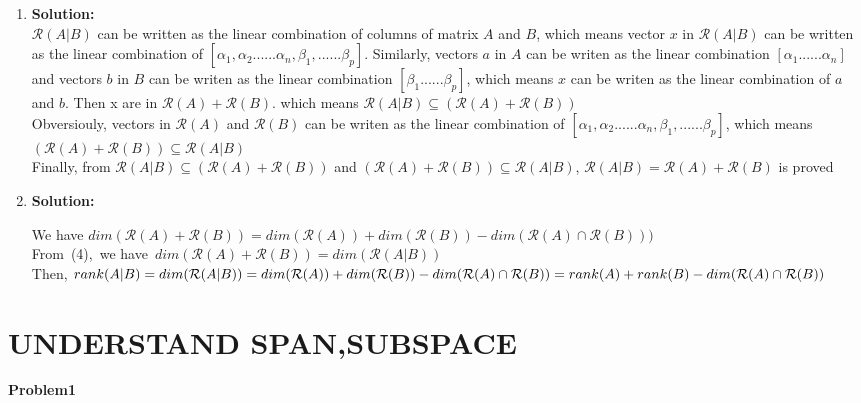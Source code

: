 \documentclass[english,onecolumn,UTF8]{IEEEtran}
\begin{document}
\begin{enumerate}
\begin{enumerate}
	\end{enumerate}

	\item \textbf{Solution:}\\
	$\mathcal{R}(A|B)$ can be written as the linear combination of columns of matrix $A$ and $B$, which means vector $x$ in $\mathcal{R}(A|B)$  can be written as the linear combination of $[\alpha_{1},\alpha_{2}......\alpha_{n},\beta_{1},......\beta_{p}]$. Similarly,  vectors $a$ in $A$ can be writen as the linear combination $[\alpha_{1}......\alpha_{n}]$ and vectors $b$ in $B$ can be writen as the linear combination $[\beta_{1}......\beta_{p}]$, which means $x$ can be writen as the linear combination of $a$ and	$b$. Then x are in $\mathcal{R}(A)+\mathcal{R}(B)$. which means $\mathcal{R}(A|B) \subseteq (\mathcal{R}(A)+\mathcal{R}(B))$
	\\ 
	Obversiouly, vectors in $\mathcal{R}(A)$ and $\mathcal{R}(B)$ can be writen as the linear combination of $[\alpha_{1},\alpha_{2}......\alpha_{n},\beta_{1},......\beta_{p}]$, which means $(\mathcal{R}(A)+\mathcal{R}(B)) \subseteq \mathcal{R}(A|B)$
	\\
	Finally, from $\mathcal{R}(A|B) \subseteq (\mathcal{R}(A)+\mathcal{R}(B))$ and $(\mathcal{R}(A)+\mathcal{R}(B)) \subseteq \mathcal{R}(A|B)$, $\mathcal{R}(A|B)=\mathcal{R}(A)+\mathcal{R}(B)$ is proved 

	\item \textbf{Solution:}

	 We have \(dim(\mathcal{R}(A)+\mathcal{R}(B))=dim(\mathcal{R}(A))+dim(\mathcal{R}(B))-dim(\mathcal{R}(A)\cap\mathcal{R}(B)))\)\\
	From\ (4),\ we have\ \(dim(\mathcal{R}(A)+\mathcal{R}(B))=dim(\mathcal{R}(A|B))\)\\
	Then, $rank(A|B)=dim(\mathcal{R}(A|B))=dim(\mathcal{R}(A))+dim(\mathcal{R}(B))-dim(\mathcal{R}(A)\cap\mathcal{R}(B))\\
	=rank(A)+rank(B)-dim(\mathcal{R}(A)\cap\mathcal{R}(B))$
	



\end{enumerate}
	
\section{UNDERSTAND SPAN,SUBSPACE}
	\textbf{Problem1}
\end{document}
